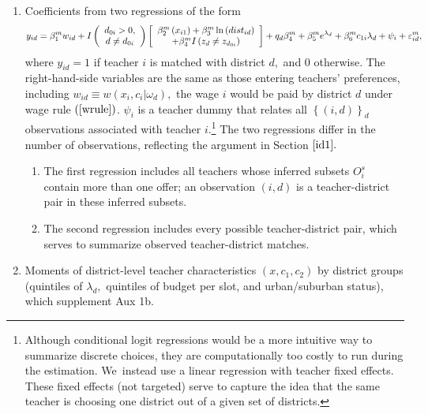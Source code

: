 \documentclass[notitlepage,12pt]{article}%
\begin{document}
\begin{enumerate}
\item[Aux 1] Coefficients from two regressions of the form%
\[
y_{id}=\beta_{1}^{m}w_{id}+I\left(
\begin{array}
[c]{c}%
d_{0i}>0,\\
d\neq d_{0i}%
\end{array}
\right)  \left[
\begin{array}
[c]{c}%
\beta_{2}^{m}\left(  x_{i1}\right)  +\beta_{3}^{m}\ln\left(  dist_{id}\right)
\\
+\beta_{4}^{m}I\left(  z_{d}\neq z_{d_{0i}}\right)
\end{array}
\right]  +q_{d}\beta_{4}^{m}+\beta_{5}^{m}e^{{\small \lambda}_{d}}+\beta
_{6}^{m}c_{1i}\lambda_{d}+\psi_{i}+\varepsilon_{id}^{m},
\]
where $y_{id}=1$ if teacher $i$ is matched with district $d,$ and $0$
otherwise. The right-hand-side variables are the same as those entering
teachers' preferences, including $w_{id}\equiv w\left(  x_{i},c_{i}|\omega
_{d}\right)  ,$ the wage $i$ would be paid by district $d$ under wage rule
$\left(  \ref{wrule}\right)  $. $\psi_{i}$ is a teacher dummy that relates all
$\left\{  \left(  i,d\right)  \right\}  _{d}$ observations associated with
teacher $i$.\footnote{Although conditional logit regressions would be a more
intuitive way to summarize discrete choices, they are computationally too
costly to run during the estimation. We\ instead use a linear regression with
teacher fixed effects. These fixed effects (not targeted) serve to capture the
idea that the same teacher is choosing one district out of a given set of
districts.} The two regressions differ in the number of observations,
reflecting the argument in Section $\ref{id1}.$

\begin{enumerate}
\item[Aux 1a] The first regression includes all teachers whose inferred
subsets $O_{i}^{s}$ contain more than one offer; an observation $(i,d)$ is a
teacher-district pair in these inferred subsets.

\item[Aux 1b] The second regression includes every possible teacher-district
pair, which serves to summarize observed teacher-district matches.
\end{enumerate}

\item[Aux 2] Moments of district-level teacher characteristics $\left(
x,c_{1},c_{2}\right)  $ by district groups (quintiles of $\lambda_{d},$
quintiles of budget per slot, and urban/suburban status), which supplement Aux 1b.


\end{enumerate}
\end{document}
